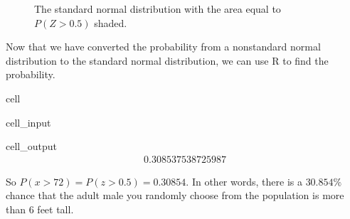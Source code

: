 \documentclass[letterpaper,10pt,english]{jupyterBook}
\begin{document}
\begin{figure}[htbp]
\centering
\capstart

\noindent{}
\caption{The standard normal distribution with the area equal to \(P(Z > 0.5)\) shaded.}\label{\detokenize{Ch4 The Normal Distribution and the Central Limit Theorem/4.3 The Normal Distribution and z-scores:stdnormal-ex9}}\end{figure}

\sphinxAtStartPar
Now that we have converted the probability from a non\sphinxhyphen{}standard normal distribution to the standard normal distribution, we can use R to find the probability.

\begin{sphinxuseclass}{cell}\begin{sphinxVerbatimInput}

\begin{sphinxuseclass}{cell_input}
\begin{sphinxVerbatim}[commandchars=\\\{\}]
\end{sphinxVerbatim}

\end{sphinxuseclass}\end{sphinxVerbatimInput}
\begin{sphinxVerbatimOutput}

\begin{sphinxuseclass}{cell_output}\begin{equation*}
\begin{split}0.308537538725987\end{split}
\end{equation*}
\end{sphinxuseclass}\end{sphinxVerbatimOutput}

\end{sphinxuseclass}
\sphinxAtStartPar
So \(P(x > 72) = P(z > 0.5) = 0.30854\). In other words, there is a \(30.854\%\) chance that the adult male you randomly choose from the population is more than \(6\) feet tall.
\end{document}
